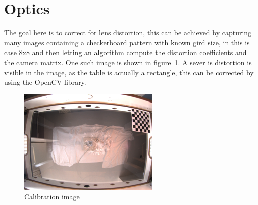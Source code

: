 \section{Optics}\label{sec:optics}
The goal here is to correct for lens distortion, this can be achieved by capturing many images containing a checkerboard pattern with known gird size, in this is case 8x8 and then letting an algorithm compute the distortion coefficients and the camera matrix.
One such image is shown in figure~\ref{fig:calibration_image}.
A sever is distortion is visible in the image, as the table is actually a rectangle, this can be corrected by using the OpenCV library.
\begin{figure}[H]
    \centering
    \includegraphics[height=5cm]{../photos/calibration_image}
    \caption[calimage]{Calibration image}
    \label{fig:calibration_image}
\end{figure}


